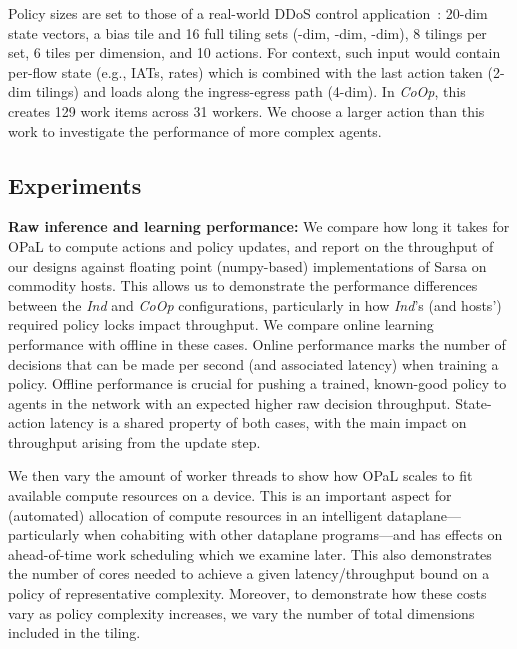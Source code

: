 \documentclass[
sigconf,natbib=false
,anonymous=true
,10pt
]{acmart}
\newcommand{\fakepara}[1]{\noindent\textbf{#1:}}
\newcommand{\approachshort}{OPaL}
\newcommand{\Coopfw}{\emph{CoOp}}
\newcommand{\coopfw}{\Coopfw}
\newcommand{\Indfw}{\emph{Ind}}
\newcommand{\indfw}{\Indfw}
\begin{document}
Policy sizes are set to those of a real-world DDoS control application~\parencite{DBLP:journals/tnsm/SimpsonRP20}: 20-dim state vectors, a bias tile and 16 full tiling sets (-dim, -dim, -dim), 8 tilings per set, 6 tiles per dimension, and 10 actions.
For context, such input would contain per-flow state (e.g., IATs, rates) which is combined with the last action taken (2-dim tilings) and loads along the ingress-egress path (4-dim).
In \Coopfw{}, this creates \num{129} work items across \num{31} workers.
We choose a larger action than this work to investigate the performance of more complex agents.

\subsection{Experiments}

\fakepara{Raw inference and learning performance}
We compare how long it takes for \approachshort{} to compute actions and policy updates, and report on the throughput of our designs against floating point (numpy-based) implementations of Sarsa on commodity hosts.
This allows us to demonstrate the performance differences between the \indfw{} and \coopfw{} configurations, particularly in how \indfw's (and hosts') required policy locks impact throughput.
We compare online learning performance with offline in these cases.
Online performance marks the number of decisions that can be made per second (and associated latency) when training a policy.
Offline performance is crucial for pushing a trained, known-good policy to agents in the network with an expected higher raw decision throughput.
State-action latency is a shared property of both cases, with the main impact on throughput arising from the update step.

We then vary the amount of worker threads to show how \approachshort{} scales to fit available compute resources on a device.
This is an important aspect for (automated) allocation of compute resources in an intelligent dataplane---particularly when cohabiting with other dataplane programs---and has effects on ahead-of-time work scheduling which we examine later.
This also demonstrates the number of cores needed to achieve a given latency/throughput bound on a policy of representative complexity.
Moreover, to demonstrate how these costs vary as policy complexity increases, we vary the number of total dimensions included in the tiling.
\end{document}
